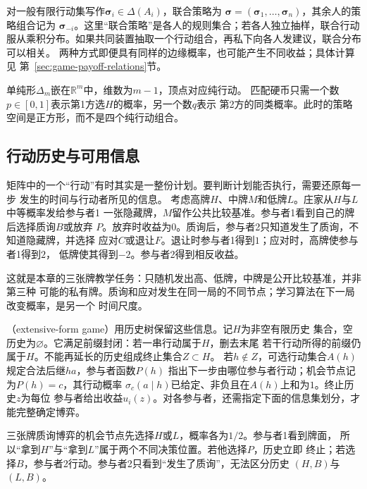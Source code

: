 对一般有限行动集写作\(\bm\sigma_i\in\Delta(A_i)\)，联合策略为
\(\bm\sigma=(\bm\sigma_1,\ldots,\bm\sigma_n)\)，其余人的策略组合记为
\(\bm\sigma_{-i}\)。这里“联合策略”是各人的规则集合；若各人独立抽样，联合行动
服从乘积分布。如果共同装置抽取一个行动组合，再私下向各人发建议，联合分布可以相关。
两种方式即便具有同样的边缘概率，也可能产生不同收益；具体计算见
第~\ref{sec:game-payoff-relations}节。

单纯形\(\Delta_m\)嵌在\(\mathbb R^m\)中，维数为\(m-1\)，顶点对应纯行动。
匹配硬币只需一个数\(p\in[0,1]\)表示第1方选\(H\)的概率，另一个数\(q\)表示
第2方的同类概率。此时的策略空间是正方形，而不是四个纯行动组合。

\subsection{行动历史与可用信息}
\label{sec:game-extensive-information}

矩阵中的一个“行动”有时其实是一整份计划。要判断计划能否执行，需要还原每一步
发生的时间与行动者所见的信息。
考虑高牌\(H\)、中牌\(M\)和低牌\(L\)。庄家从\(H\)与\(L\)中等概率发给参与者1
一张隐藏牌，\(M\)留作公共比较基准。参与者1看到自己的牌后选择质询\(B\)或放弃
\(P\)。放弃时收益为\(0\)。质询后，参与者2只知道发生了质询，不知道隐藏牌，并选择
应对\(C\)或退让\(F\)。退让时参与者1得到\(1\)；应对时，高牌使参与者1得到\(2\)，
低牌使其得到\(-2\)。参与者2得到相反收益。

这就是本章的三张牌教学任务：只随机发出高、低牌，中牌是公开比较基准，并非第三种
可能的私有牌。质询和应对发生在同一局的不同节点；学习算法在下一局改变概率，是另一个
时间尺度。
\begin{definition}[有限扩展式博弈的历史树]
\label{def:game-finite-extensive-history}
（extensive-form game）用历史树保留这些信息。记\(H\)为非空有限历史
集合，空历史为\(\varnothing\)。它满足前缀封闭：若一串行动属于\(H\)，删去末尾
若干行动所得的前缀仍属于\(H\)。不能再延长的历史组成终止集合\(Z\subset H\)。
若\(h\notin Z\)，可选行动集合\(A(h)\)规定合法后继\(ha\)，参与者函数\(P(h)\)
指出下一步由哪位参与者行动；机会节点记为\(P(h)=c\)，其行动概率
\(\sigma_c(a\mid h)\)已给定、非负且在\(A(h)\)上和为\(1\)。终止历史\(z\)为每位
参与者给出收益\(u_i(z)\)。对各参与者，还需指定下面的信息集划分，才能完整确定博弈。
\end{definition}

三张牌质询博弈的机会节点先选择\(H\)或\(L\)，概率各为\(1/2\)。参与者1看到牌面，
所以“拿到\(H\)”与“拿到\(L\)”属于两个不同决策位置。若他选择\(P\)，历史立即
终止；若选择\(B\)，参与者2行动。参与者2只看到“发生了质询”，无法区分历史
\((H,B)\)与\((L,B)\)。

